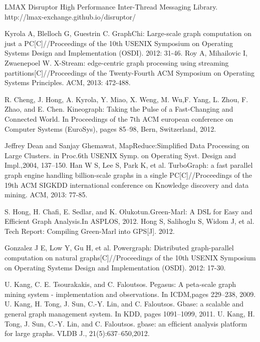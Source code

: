 \documentclass[twocolumn,a4paper,10pt]{article}
\begin{document}
\begin{thebibliography}{00}
\setlength{\itemsep}{0pt}
    
	LMAX Disruptor High Performance Inter-Thread Messaging Library. http://lmax-exchange.github.io/disruptor/

     Kyrola A, Blelloch G, Guestrin C. GraphChi: Large-scale graph computation on just a PC[C]//Proceedings of the 10th USENIX Symposium on Operating Systems Design and Implementation (OSDI). 2012: 31-46.
    Roy A, Mihailovic I, Zwaenepoel W. X-Stream: edge-centric graph processing using streaming partitions[C]//Proceedings of the Twenty-Fourth ACM Symposium on Operating Systems Principles. ACM, 2013: 472-488.
    
    R. Cheng, J. Hong, A. Kyrola, Y. Miao, X. Weng, M. Wu,F. Yang, L. Zhou, F. Zhao, and E. Chen. Kineograph: Taking the Pulse of a Fast-Changing and Connected World. In Proceedings of the 7th ACM european conference on Computer Systems (EuroSys), pages 85–98, Bern, Switzerland, 2012.
    
    Jeffrey Dean and Sanjay Ghemawat, MapReduce:Simplified Data Processing on Large Clusters. in Proc.6th USENIX Symp. on Operating Syst. Design and Impl.,2004, 137–150.
    Han W S, Lee S, Park K, et al. TurboGraph: a fast parallel graph engine handling billion-scale graphs in a single PC[C]//Proceedings of the 19th ACM SIGKDD international conference on Knowledge discovery and data mining. ACM, 2013: 77-85.
    
    S. Hong, H. Chafi, E. Sedlar, and K. Olukotun.Green-Marl: A DSL for Easy and Efficient  Graph Analysis.In ASPLOS, 2012.
    Hong S, Salihoglu S, Widom J, et al. Tech Report: Compiling Green-Marl into GPS[J]. 2012.
    
    Gonzalez J E, Low Y, Gu H, et al. Powergraph: Distributed graph-parallel computation on natural graphs[C]//Proceedings of the 10th USENIX Symposium on Operating Systems Design and Implementation (OSDI). 2012: 17-30.
    
    U. Kang, C. E. Tsourakakis, and C. Faloutsos. Pegasus: A peta-scale graph mining system - implementation and observations. In ICDM,pages 229–238, 2009.
   U. Kang, H. Tong, J. Sun, C.-Y. Lin, and C. Faloutsos. Gbase: a scalable and general graph management system. In KDD, pages 1091–1099, 2011.
	U. Kang, H. Tong, J. Sun, C.-Y. Lin, and C. Faloutsos. gbase: an efﬁcient analysis platform for large graphs. VLDB J., 21(5):637–650,2012.
    

\end{thebibliography}
\end{document}
